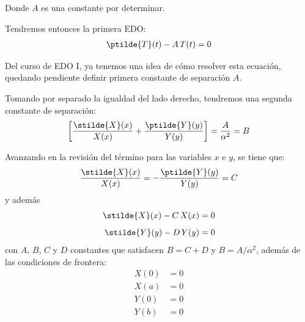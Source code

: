 Donde $A$ es una constante por determinar.

Tendremos entonces la primera EDO:
\begin{align}
\ptilde{T}(t) - A \, T(t) = 0
\label{eq:ecuacion_02_195}
\end{align}

Del curso de EDO I, ya tenemos una idea de cómo resolver esta ecuación, quedando pendiente definir primera constante de separación $A$.
\par
Tomando por separado la igualdad del lado derecho, tendremos una segunda constante de separación:
\begin{align*}
    \left[ \dfrac{\stilde{X}(x)}{X(x)} + \dfrac{\ptilde{Y}(y)}{Y(y)} \right]  = \dfrac{A}{\alpha^{2}} = B
\end{align*}    

Avanzando en la revisión del término para las variables $x$ e $y$, se tiene que:
\begin{align*}
\dfrac{\stilde{X}(x)}{X(x)} = -  \dfrac{\ptilde{Y}(y)}{Y(y)} = C
\end{align*}
y además
\begin{align}
\stilde{X}(x) - C \, X(x) = 0 \label{eq:ecuacion_02_196} \\[0.5em]
\stilde{Y}(y) - D \, Y(y) = 0 \label{eq:ecuacion_02_197}
\end{align}
con $A$, $B$, $C$ y $D$ constantes que satisfacen $B = C + D$ y $B = A / \alpha^{2}$, además de las condiciones de frontera:
\begin{align}
X(0) &= 0 \label{eq:ecuacion_02_198} \\[0.5em]
X(a) &= 0 \label{eq:ecuacion_02_199} \\[0.5em]
Y(0) &= 0 \label{eq:ecuacion_02_200} \\[0.5em]
Y(b) &= 0 \label{eq:ecuacion_02_201} \\[0.5em]
\end{align}

